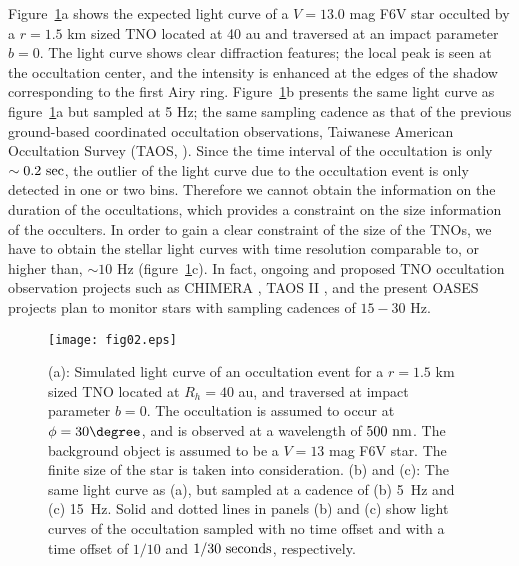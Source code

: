 \documentclass{pasj01}
\newcommand{\void}[1]{}
\renewcommand{\textcolor}{\void}
\begin{document}
Figure~\ref{fig1}a shows the expected light curve of a $V= 13.0$ mag F6V star
occulted by a \textcolor{red}{$r = 1.5$} km sized TNO located at 40 au and traversed at an impact parameter $b=0$.
The light curve shows clear diffraction features; 
the local peak is seen at the occultation center, 
and the intensity is enhanced at 
the edges of the shadow corresponding to the first Airy ring. 
Figure~\ref{fig1}b presents the same light curve as figure~\ref{fig1}a but sampled at 5 Hz; 
the same sampling cadence as that of the previous 
ground-based coordinated occultation observations,
Taiwanese American Occultation Survey (TAOS, \citet{lehner09}).
Since the time interval of the occultation is
only $\sim 0.2 \ {\rm sec}$,
the outlier of the light curve due to the occultation event 
is only detected in one or two bins.
Therefore we cannot obtain the information on the duration of the occultations, 
which provides a constraint on the size information of the occulters.
In order to gain a clear constraint of the size of the TNOs, 
we have to obtain the stellar light curves with time resolution 
comparable to, or higher than, $\sim 10$ Hz (figure~\ref{fig1}c).
In fact, ongoing and proposed TNO occultation observation projects such as 
CHIMERA \citep{harding16},
TAOS II \citep{lehner14},  
and the present OASES projects  
plan to monitor stars with sampling cadences of $15-30$ Hz.

\begin{figure}[!t]
\begin{center}
 \texttt{[image: fig02.eps]}
   \caption{(a): Simulated light curve of an occultation event for a \textcolor{red}{$r = 1.5$}  km sized TNO located at $R_h = 40$ au, 
   and traversed at impact parameter $b=0$. The occultation is assumed to occur at $\phi = 30\degree$, 
   and is observed at a wavelength of $500 \ {\rm nm}$.
    The background object is assumed to be a $V= 13$ mag F6V star.	
   The finite size of the star is taken into consideration.
   (b) and (c): The same light curve  as (a), but sampled at a cadence of (b) 5\ Hz and (c) 15\ Hz.
   Solid and dotted lines in panels (b) and (c) show light curves of the occultation 
   sampled with no time offset and with a time offset of $1/10$ and $1/30\ {\rm seconds}$, respectively.}
   \label{fig1}
 \end{center}
\end{figure}
\end{document}
